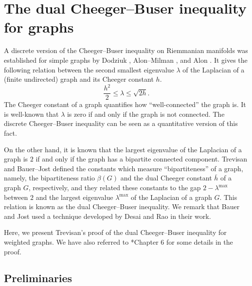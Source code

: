 \documentclass[12pt,a4paper,bold]{thesis}
\theoremstyle{definition}
\begin{document}
\chapter{The dual Cheeger--Buser inequality for graphs} \label{ch:dualCBGraphs}

A discrete version of the Cheeger--Buser inequality on Riemmanian manifolds 
was established for simple graphs by Dodziuk \cite{Dodziuk84}, 
Alon--Milman \cite{Alon-Milman85}, and Alon \cite{Alon-vertexCheeger86}. 
It gives the following relation between the second smallest eigenvalue $\lambda$ 
of the Laplacian of a (finite undirected) graph and its Cheeger constant $h$.
\begin{equation*}
    \frac{h^2}{2} \leq \lambda \leq \sqrt{2h}.
\end{equation*}
The Cheeger constant of a graph quantifies how ``well-connected'' the graph is.
It is well-known that $\lambda$ is zero if and only if the graph is not connected. 
The discrete Cheeger--Buser inequality can be seen as a quantitative version of this fact.

On the other hand, it is known that the largest eigenvalue of the Laplacian 
of a graph is $2$ if and only if the graph has a bipartite connected component.
Trevisan \cite{Trevisan-MaxCut12} and Bauer--Jost \cite{Bauer-Jost13} defined 
the constants which measure ``bipartiteness'' of a graph, namely, the bipartiteness ratio 
$\beta(G)$ and the dual Cheeger constant $\bar{h}$ of a graph $G$, respectively, 
and they related these constants to the gap $2 - \lambda^{\max}$ between $2$ and 
the largest eigenvalue $\lambda^{\max}$ of the Laplacian of a graph $G$. This relation 
is known as the dual Cheeger--Buser inequality. We remark that Bauer and Jost used 
a technique developed by Desai and Rao \cite{Desai-Rao94} in their work.

Here, we present Trevisan's proof \cite{Trevisan-MaxCut12}
of the dual Cheeger--Buser inequality for weighted graphs. We have also referred 
to \cite{Trevisan-notes-expanders}*{Chapter 6} for some details in the proof.

\section{Preliminaries}
\end{document}
